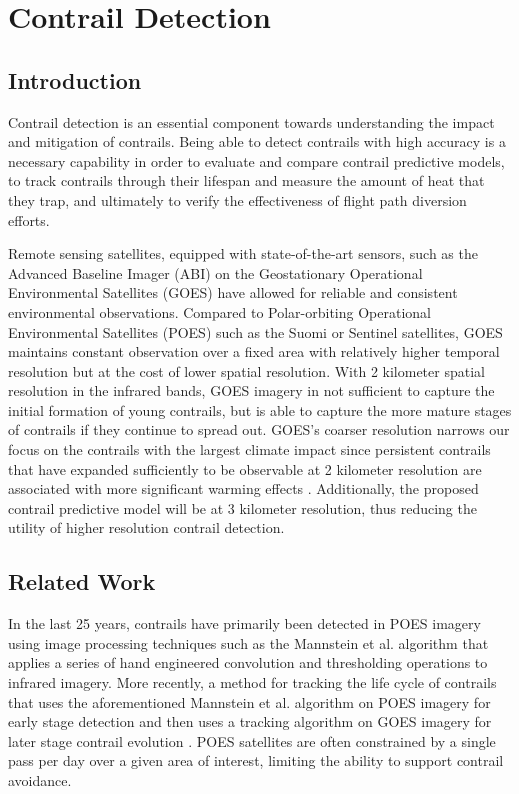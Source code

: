 \section{Contrail Detection}
\label{sec:intro}

\subsection{Introduction}

Contrail detection is an essential component towards understanding the impact and mitigation of contrails. Being able to detect contrails with high accuracy is a necessary capability in order to evaluate and compare contrail predictive models, to track contrails through their lifespan and measure the amount of heat that they trap, and ultimately to verify the effectiveness of flight path diversion efforts.

Remote sensing satellites, equipped with state-of-the-art sensors, such as the Advanced Baseline Imager (ABI) on the Geostationary Operational Environmental Satellites (GOES) \cite{goes} have allowed for reliable and consistent environmental observations. Compared to Polar-orbiting Operational Environmental Satellites (POES) such as the Suomi or Sentinel satellites, GOES maintains constant observation over a fixed area with relatively higher temporal resolution but at the cost of lower spatial resolution. With 2 kilometer spatial resolution in the infrared bands, GOES imagery in not sufficient to capture the initial formation of young contrails, but is able to capture the more mature stages of contrails if they continue to spread out. GOES's coarser resolution narrows our focus on the contrails with the largest climate impact since persistent contrails that have expanded sufficiently to be observable at 2 kilometer resolution are associated with more significant warming effects \cite{warm, persist}. Additionally, the proposed contrail predictive model will be at 3 kilometer resolution, thus reducing the utility of higher resolution contrail detection. 

\subsection{Related Work}

In the last 25 years, contrails have primarily been detected in POES imagery using image processing techniques such as the Mannstein et al. algorithm \cite{mannstein} that applies a series of hand engineered convolution and thresholding operations to infrared imagery. More recently, a method for tracking the life cycle of contrails that uses the aforementioned Mannstein et al. algorithm on POES imagery for early stage detection and then uses a tracking algorithm on GOES imagery for later stage contrail evolution \cite{track}. POES satellites are often constrained by a single pass per day over a given area of interest, limiting the ability to support contrail avoidance.

